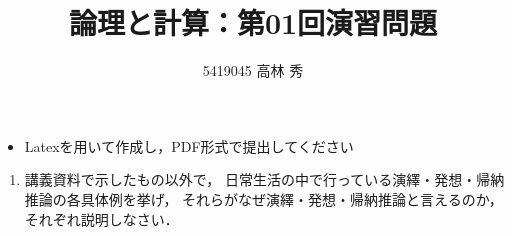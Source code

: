\documentclass[dvipdfmx]{jsarticle}
\def\NO{01}
\def\LECTURENAME{論理と計算}
\begin{document}
\title{\LECTURENAME{}：第\NO{}回演習問題}

\author{5419045 高林 秀}

\date{}
\maketitle

\begin{itemize}
\item Latexを用いて作成し，PDF形式で提出してください
\end{itemize}


\vspace*{\baselineskip}

\begin{enumerate}\setlength{\itemsep}{\baselineskip}

\item
  講義資料で示したもの以外で，
  日常生活の中で行っている演繹・発想・帰納推論の各具体例を挙げ，
  それらがなぜ演繹・発想・帰納推論と言えるのか，それぞれ説明しなさい．

\end{enumerate}
\end{document}
